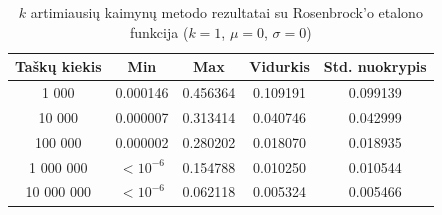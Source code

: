 \begin{table}[H]
    \centering
    \begin{tabular}{|c|c|c|c|c|}
        \hline
        \textbf{Taškų kiekis} & \textbf{Min} & \textbf{Max} & \textbf{Vidurkis} & \textbf{Std. nuokrypis} \\ \hline
        1 000        & 0.000146 & 0.456364 & 0.109191 & 0.099139 \\ \hline
        10 000       & 0.000007 & 0.313414 & 0.040746 & 0.042999 \\ \hline
        100 000      & 0.000002 & 0.280202 & 0.018070 & 0.018935 \\ \hline
        1 000 000    & $<10^{-6}$ & 0.154788 & 0.010250 & 0.010544 \\ \hline
        10 000 000   & $<10^{-6}$ & 0.062118 & 0.005324 & 0.005466 \\ \hline
    \end{tabular}
    \caption{$k$ artimiausių kaimynų metodo rezultatai su Rosenbrock'o etalono funkcija ($k = 1$, $\mu = 0$, $\sigma = 0$)}
\end{table}